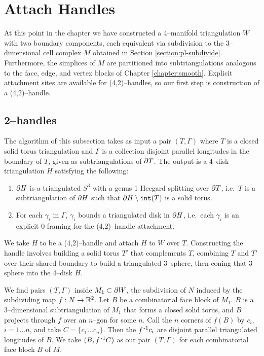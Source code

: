 \section{Attach Handles}
\label{section:pl-handle}

At this point in the chapter we have constructed a 4--manifold triangulation $W$ with two boundary components, each equivalent via subdivision to the 3--dimensional cell complex $M$ obtained in Section \ref{section:pl-subdivide}.
Furthermore, the simplices of $M$ are partitioned into subtriangulations analogous to the face, edge, and vertex blocks of Chapter \ref{chapter:smooth}.
Explicit attachment sites are available for (4,2)--handles, so our first step is construction of a (4,2)--handle.

\subsection{2--handles}
\label{section:pl-2-handle}

The algorithm of this subsection takes as input a pair $(T,\Gamma)$ where $T$ is a closed solid torus triangulation and $\Gamma$ is a collection disjoint parallel longitudes in the boundary of $T$, given as subtriangulations of $\partial T$.
The output is a 4--disk triangulation $H$ satisfying the following:
\begin{enumerate}
	\item $\partial H$ is a triangulated $S^3$ with a genus 1 Heegard splitting over $\partial T$, i.e.\ $T$ is a subtriangulation of $\partial H$ such that $\partial H\setminus \texttt{int}(T)$ is a solid torus.
	\item For each $\gamma_i$ in $\Gamma$, $\gamma_i$ bounds a triangulated disk in $\partial H$, i.e.\ each $\gamma_i$ is an explicit 0-framing for the (4,2)--handle attachment.
\end{enumerate}
We take $H$ to be a (4,2)--handle and attach $H$ to $W$ over $T$.
Constructing the handle involves building a solid torus $T'$ that complements $T$, combining $T$ and $T'$ over their shared boundary to build a triangulated 3--sphere, then coning that 3--sphere into the 4--disk $H$.

We find pairs $(T,\Gamma)$ inside $M_1\subset\partial W$, the subdivision of $N$ induced by the subdividing map $f:N\to\mathbb{R}^2$.
Let $B$ be a combinatorial face block of $M_1$.
$B$ is a 3--dimensional subtriangulation of $M_1$ that forms a closed solid torus,
and $B$ projects through $f$ over an $n$--gon for some $n$.
Call the $n$ corners of $f(B)$ by $c_i$, $i=1\dots n$, and take $C=\{c_1\dots c_n\}$.
Then the $f^{\,\text{-}1} c_i$ are disjoint parallel triangulated longitudes of $B$.
We take $(B, f^{\,\text{-}1} C)$ as our pair $(T,\Gamma)$ for each combinatorial face block $B$ of $M$.

